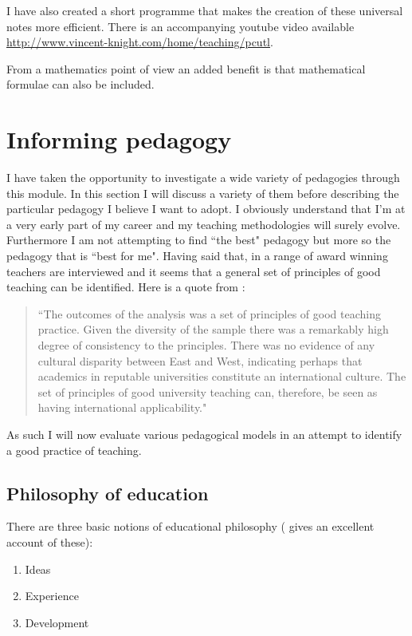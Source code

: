 \documentclass[a4paper,12pt]{article}
\begin{document}
I have also created a short programme that makes the creation of these universal notes more efficient. There is an accompanying youtube video available \url{http://www.vincent-knight.com/home/teaching/pcutl}.

From a mathematics point of view an added benefit is that mathematical formulae can also be included.

\section{Informing pedagogy}

I have taken the opportunity to investigate a wide variety of pedagogies through this module. In this section I will discuss a variety of them before describing the particular pedagogy I believe I want to adopt. I obviously understand that I'm at a very early part of my career and my teaching methodologies will surely evolve. Furthermore I am not attempting to find ``the best" pedagogy but more so the pedagogy that is ``best for me". Having said that, in \cite{Kember2007a} a range of award winning teachers are interviewed and it seems that a general set of principles of good teaching can be identified. Here is a quote from \cite{Kember2007a}:

\begin{quote}
    ``The outcomes of the analysis was a set of principles of good teaching practice. Given the diversity of the sample there was a remarkably high degree of consistency to the principles. There was no evidence of any cultural disparity between East and West, indicating perhaps that academics in reputable universities constitute an international culture. The set of principles of good university teaching can, therefore, be seen as having international applicability."
\end{quote}

As such I will now evaluate various pedagogical models in an attempt to identify a good practice of teaching.

\subsection{Philosophy of education}

There are three basic notions of educational philosophy (\cite{Jordan2008a} gives an excellent account of these):

\begin{enumerate}
    \item Ideas
    \item Experience
    \item Development
\end{enumerate}
\end{document}

